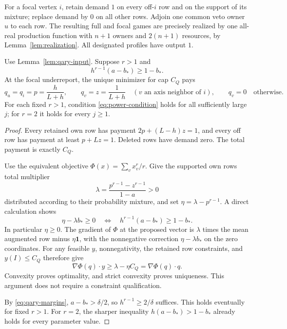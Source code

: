 For a focal vertex $i$, retain demand $1$ on every off-$i$ row and on
the support of its mixture; replace demand by $0$ on all other rows.
Adjoin one common veto owner $u$ to each row.  The resulting full and
focal games are precisely realized by one all-real production function
with $n+1$ owners and $2(n+1)$ resources, by
Lemma~\ref{lem:realization}.  All designated profiles have output $1$.

\begin{lemma}
\label{lem:power-certificate}
Use Lemma~\ref{lem:qary-input}.  Suppose $r>1$ and
\begin{equation}
 h^{r-1}(a-b_*)\ge1-b_*.
 \label{eq:power-condition}
\end{equation}
At the focal underreport, the unique minimizer for cap $C_Q$ pays
\[
 q_u=q_i=p=\frac h{L+h},\qquad
 q_v=z=\frac1{L+h}\quad(v\text{ an axis neighbor of }i),
 \qquad q_v=0\quad\text{otherwise}.
\]
For each fixed $r>1$, condition \eqref{eq:power-condition} holds for all
sufficiently large $j$; for $r=2$ it holds for every $j\ge1$.
\end{lemma}
\begin{proof}
Every retained own row has payment $2p+(L-h)z=1$, and every off row has
payment at least $p+Lz=1$.  Deleted rows have demand zero.  The total
payment is exactly $C_Q$.

Use the equivalent objective $\Phi(x)=\sum_v x_v^r/r$.  Give the supported
own rows total multiplier
\[
 \lambda=\frac{p^{r-1}-z^{r-1}}{1-a}>0
\]
distributed according to their probability mixture, and set
$\eta=\lambda-p^{r-1}$.  A direct calculation shows
\[
 \eta-\lambda b_*\ge0
 \quad\Longleftrightarrow\quad
 h^{r-1}(a-b_*)\ge1-b_*.
\]
In particular $\eta\ge0$.  The gradient of $\Phi$ at the proposed vector
is $\lambda$ times the mean augmented row minus $\eta\mathbf1$, with
the nonnegative correction $\eta-\lambda b_*$ on the zero coordinates.
For any feasible $y$, nonnegativity, the retained row constraints, and
$y(I)\le C_Q$ therefore give
\[
 \nabla\Phi(q)\cdot y\ge\lambda-\eta C_Q
                          =\nabla\Phi(q)\cdot q.
\]
Convexity proves optimality, and strict convexity proves uniqueness.
This argument does not require a constraint qualification.

By \eqref{eq:qary-margins}, $a-b_*>\delta/2$, so
$h^{r-1}\ge2/\delta$ suffices.  This holds eventually for fixed $r>1$.
For $r=2$, the sharper inequality $h(a-b_*)>1-b_*$ already holds for
every parameter value.
\end{proof}

